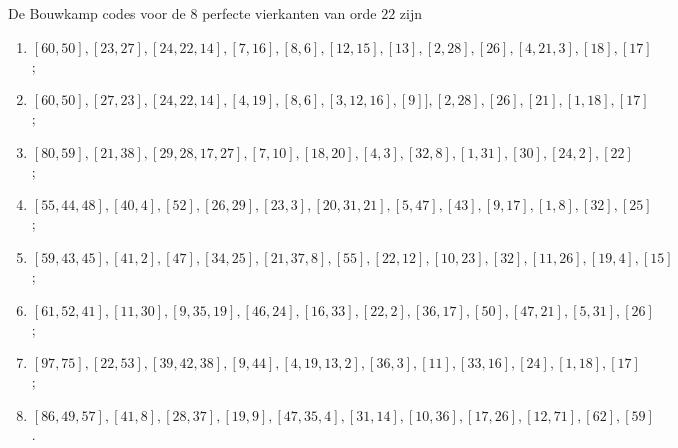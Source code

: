 \documentclass[10pt]{article}
\begin{document}
De Bouwkamp codes voor de 8 perfecte vierkanten van orde $22$ zijn
\begin{enumerate}
  \item $[60,50], [23,27], [24,22,14], [7,16], [8,6], [12,15], [13], [2,28], [26], [4,21,3], [18], [17]$;
  \item $[60,50], [27,23], [24,22,14], [4,19], [8,6], [3,12,16], [9]], [2,28], [26], [21], [1,18], [17]$;
  \item $[80,59], [21,38], [29,28,17,27], [7,10], [18,20], [4,3], [32,8], [1,31], [30], [24,2], [22]$;
  \item $[55,44,48], [40,4], [52], [26,29], [23,3], [20,31,21], [5,47], [43], [9,17], [1,8], [32], [25]$;
  \item $[59,43,45], [41,2], [47], [34,25], [21,37,8], [55], [22,12], [10,23], [32], [11,26], [19,4], [15]$;
  \item $[61,52,41], [11,30], [9,35,19], [46,24], [16,33], [22,2], [36,17], [50], [47,21], [5,31], [26]$;
  \item $[97,75], [22,53], [39,42,38], [9,44], [4,19,13,2], [36,3], [11], [33,16], [24], [1,18], [17]$;
  \item $[86,49,57], [41,8], [28,37], [19,9], [47,35,4], [31,14], [10,36], [17,26], [12,71], [62], [59]$.
\end{enumerate}
\end{document}
